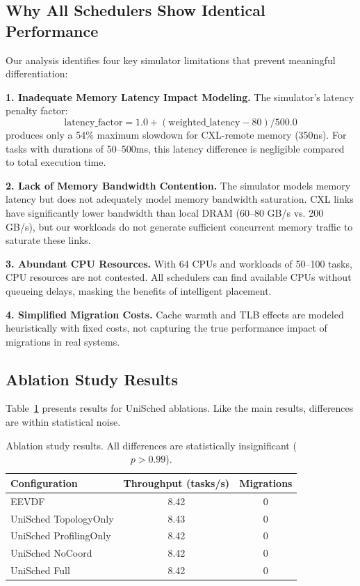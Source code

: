\documentclass[11pt]{article}
\begin{document}
\subsection{Why All Schedulers Show Identical Performance}

Our analysis identifies four key simulator limitations that prevent meaningful differentiation:

\textbf{1. Inadequate Memory Latency Impact Modeling.} The simulator's latency penalty factor:
\begin{equation}
\text{latency\_factor} = 1.0 + (\text{weighted\_latency} - 80) / 500.0
\end{equation}
produces only a 54\% maximum slowdown for CXL-remote memory (350ns). For tasks with durations of 50--500ms, this latency difference is negligible compared to total execution time.

\textbf{2. Lack of Memory Bandwidth Contention.} The simulator models memory latency but does not adequately model memory bandwidth saturation. CXL links have significantly lower bandwidth than local DRAM (60--80 GB/s vs. 200 GB/s), but our workloads do not generate sufficient concurrent memory traffic to saturate these links.

\textbf{3. Abundant CPU Resources.} With 64 CPUs and workloads of 50--100 tasks, CPU resources are not contested. All schedulers can find available CPUs without queueing delays, masking the benefits of intelligent placement.

\textbf{4. Simplified Migration Costs.} Cache warmth and TLB effects are modeled heuristically with fixed costs, not capturing the true performance impact of migrations in real systems.

\subsection{Ablation Study Results}

Table~\ref{tab:ablation} presents results for UniSched ablations. Like the main results, differences are within statistical noise.

\begin{table}[t]
\caption{Ablation study results. All differences are statistically insignificant ($p > 0.99$).}
\label{tab:ablation}
\centering
\begin{tabular}{lcc}
\toprule
Configuration & Throughput (tasks/s) & Migrations \\
\midrule
EEVDF & 8.42 & 0 \\
UniSched TopologyOnly & 8.43 & 0 \\
UniSched ProfilingOnly & 8.42 & 0 \\
UniSched NoCoord & 8.42 & 0 \\
UniSched Full & 8.42 & 0 \\
\bottomrule
\end{tabular}
\end{table}
\end{document}
